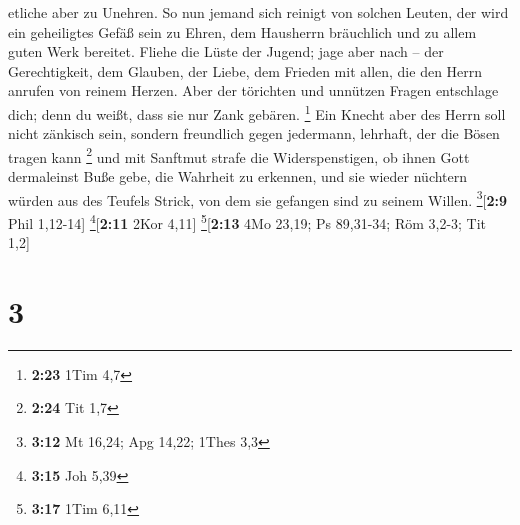 etliche aber zu Unehren.  So nun jemand sich reinigt von
solchen Leuten, der wird ein geheiligtes Gefäß sein zu Ehren, dem
Hausherrn bräuchlich und zu allem guten Werk bereitet. 
Fliehe die Lüste der Jugend; jage aber nach -- der Gerechtigkeit, dem
Glauben, der Liebe, dem Frieden mit allen, die den Herrn anrufen von
reinem Herzen.  Aber der törichten und unnützen Fragen
entschlage dich; denn du weißt, dass sie nur Zank gebären. \footnote{\textbf{2:23}
  1Tim 4,7}  Ein Knecht aber des Herrn soll nicht
zänkisch sein, sondern freundlich gegen jedermann, lehrhaft, der die
Bösen tragen kann \footnote{\textbf{2:24} Tit 1,7}  und
mit Sanftmut strafe die Widerspenstigen, ob ihnen Gott dermaleinst Buße
gebe, die Wahrheit zu erkennen,  und sie wieder nüchtern
würden aus des Teufels Strick, von dem sie gefangen sind zu seinem
Willen. \footnote{\textbf{3:12} Mt 16,24; Apg 14,22; 1Thes 3,3}{[}\textbf{2:9}
Phil 1,12-14{]} \footnote{\textbf{3:15} Joh 5,39}{[}\textbf{2:11} 2Kor
4,11{]} \footnote{\textbf{3:17} 1Tim 6,11}{[}\textbf{2:13} 4Mo 23,19; Ps
89,31-34; Röm 3,2-3; Tit 1,2{]}

\hypertarget{section-2}{%
\section{3}\label{section-2}}

